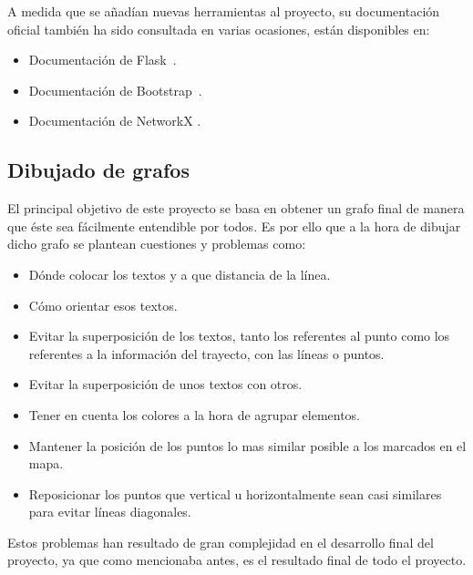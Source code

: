 A medida que se añadían nuevas herramientas al proyecto, su documentación
oficial también ha sido consultada en varias ocasiones, están disponibles en:
\begin{itemize}
	\item Documentación de Flask~\cite{doc:flask}.
	\item Documentación de Bootstrap~\cite{doc:bootstrap}.
	\item Documentación de NetworkX \cite{SciPyProceedings_11}.
\end{itemize}

\subsection{Dibujado de grafos}
El principal objetivo de este proyecto se basa en obtener un grafo final de manera que éste sea fácilmente entendible por todos. Es por ello que a la hora de dibujar dicho grafo se plantean cuestiones y problemas como:
\begin{itemize}
	\item Dónde colocar los textos y a que distancia de la línea.
	\item Cómo orientar esos textos.
	\item Evitar la superposición de los textos, tanto los referentes al punto como los referentes a la información del trayecto, con las líneas o puntos.
	\item Evitar la superposición de unos textos con otros.
	\item Tener en cuenta los colores a la hora de agrupar elementos.
	\item Mantener la posición de los puntos lo mas similar posible a los marcados en el mapa.
	\item Reposicionar los puntos que vertical u horizontalmente sean casi similares para evitar líneas diagonales.
\end{itemize}

Estos problemas han resultado de gran complejidad en el desarrollo final del proyecto, ya que como mencionaba antes, es el resultado final de todo el proyecto.

